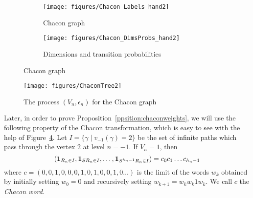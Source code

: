 \documentclass[12pt,a4paper]{article}
\begin{document}
%


\begin{figure}[!h]
   \centering
   \begin{subfigure}[t]{0.47\textwidth}
   \centering
   	\texttt{[image: figures/Chacon\_Labels\_hand2]}
 		\caption{\footnotesize Chacon graph}\label{fig:ChaconLabels}
    \end{subfigure}              
   \quad
    \begin{subfigure}[t]{0.47\textwidth}
    \centering
   	\texttt{[image: figures/Chacon\_DimsProbs\_hand2]}
 		\caption{\footnotesize Dimensions and transition probabilities}\label{fig:ChaconDimsProbs}
 	\end{subfigure}      

   \caption{Chacon graph}\label{fig:ChaconGraph}
 \end{figure}

\begin{figure}[!h]
\centering
	\texttt{[image: figures/ChaconTree2]}
\caption{The process $(V_n, \epsilon_n)$ for the Chacon graph}
\label{fig:ChaconProcess}
\end{figure}

Later, in order to prove Proposition~\ref{ppsition:chaconweights}, 
we will use the following property of the Chacon transformation, which is 
easy to see with the help of Figure~\ref{fig:ChaconProcess}. 
Let $I = \{\gamma \mid v_{-1}(\gamma)=2\}$ be the set of infinite paths 
which pass through the vertex $2$ at level $n=-1$. 
If $V_n=1$, then 
\begin{equation}\label{eq:ChaconWord}
(\boldsymbol 1_{R_n \in I}, \boldsymbol 1_{SR_n \in I}, \ldots, \boldsymbol 1_{S^{h_n-1}R_n \in I}) 
= c_0c_1\ldots c_{h_n-1}
\end{equation}
where $c = (0, 0, 1, 0, 0, 0, 1, 0, 1, 0, 0, 1, 0 \ldots)$ is the limit of 
the words $w_k$ obtained by initially setting $w_0=0$ and 
recursively setting $w_{k+1} = w_kw_k1w_k$. 
We call $c$ the \emph{Chacon word}. 
\end{document}
